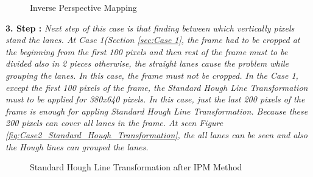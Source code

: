  
\begin{figure}[H]
  \centering
  \hfill
  \caption{Inverse Perspective Mapping}
\end{figure} 


\textbf{3. Step : }\emph{\color{blue}Next step of this case is that finding between which vertically pixels stand the lanes. At Case 1(Section \ref{sec:Case 1}, the frame had to be cropped at the beginning from the first 100 pixels and then rest of the frame must to be divided also in 2 pieces otherwise, the straight lanes cause the problem while grouping the lanes. In this case, the frame must not be cropped. In the Case 1, except the first 100 pixels of the frame, the Standard Hough Line Transformation must to be applied for 380x640 pixels. In this case, just the last 200 pixels of the frame is enough for appling Standard Hough Line Transformation. Because these 200 pixels can cover all lanes in the frame. At seen Figure \ref{fig:Case2_Standard_Hough_Transformation}, the all lanes can be seen and also the Hough lines can grouped the lanes.}   


\begin{figure}[H]
  \centering
  \caption{Standard Hough Line Transformation after IPM Method}
\end{figure} 



